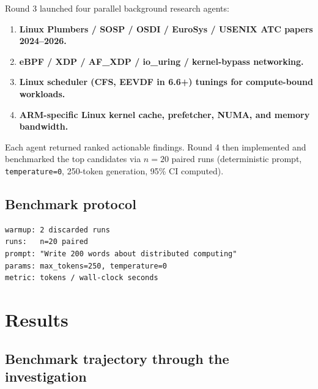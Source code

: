 \documentclass[10pt,a4paper]{article}
\begin{document}
Round 3 launched four parallel background research agents:

\begin{enumerate}[leftmargin=*,nosep]
  \item \textbf{Linux Plumbers / SOSP / OSDI / EuroSys / USENIX ATC papers 2024--2026.}
  \item \textbf{eBPF / XDP / AF\_XDP / io\_uring / kernel-bypass networking.}
  \item \textbf{Linux scheduler (CFS, EEVDF in 6.6+) tunings for compute-bound workloads.}
  \item \textbf{ARM-specific Linux kernel cache, prefetcher, NUMA, and memory bandwidth.}
\end{enumerate}

Each agent returned ranked actionable findings. Round 4 then implemented and benchmarked the top candidates via $n=20$ paired runs (deterministic prompt, \texttt{temperature=0}, 250-token generation, 95\% CI computed).

\subsection{Benchmark protocol}

\begin{lstlisting}
warmup: 2 discarded runs
runs:   n=20 paired
prompt: "Write 200 words about distributed computing"
params: max_tokens=250, temperature=0
metric: tokens / wall-clock seconds
\end{lstlisting}

\section{Results}

\subsection{Benchmark trajectory through the investigation}
\end{document}
